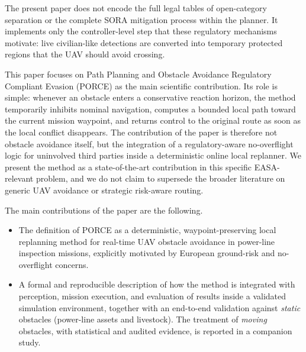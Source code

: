 \documentclass[drones,article,submit,moreauthors]{Definitions/mdpi}
\begin{document}
 The present paper does not encode the full legal tables of open-category separation or the complete SORA mitigation process within the planner. It implements only the controller-level step that these regulatory mechanisms motivate: live civilian-like detections are converted into temporary protected regions that the UAV should avoid crossing.


This paper focuses on Path Planning and 
Obstacle Avoidance Regulatory Compliant Evasion (PORCE) as the main scientific contribution. %
Its role is simple: whenever an obstacle enters a conservative reaction horizon, the method temporarily inhibits nominal navigation, computes a bounded local path toward the current mission waypoint, and returns control to the original route as soon as the local conflict disappears. The contribution of the paper is therefore not obstacle avoidance itself, but the integration of a regulatory-aware no-overflight logic for uninvolved third parties inside a deterministic online local replanner. We present the method as a state-of-the-art contribution in this specific EASA-relevant problem, and we do not claim to supersede the broader literature on generic UAV avoidance or strategic risk-aware routing.

The main contributions of the paper are the following.
\begin{itemize}
    \item The definition of PORCE as a deterministic, waypoint-preserving local replanning method for real-time UAV obstacle avoidance in power-line inspection missions, explicitly motivated by European ground-risk and no-overflight concerns.
    \item A formal and reproducible description of how the method is integrated with perception, mission execution, and evaluation of results inside a validated simulation environment, together with an end-to-end validation against \emph{static} obstacles (power-line assets and livestock). The treatment of \emph{moving} obstacles, with statistical and audited evidence, is reported in a companion study.
    

\end{itemize}
\end{document}
